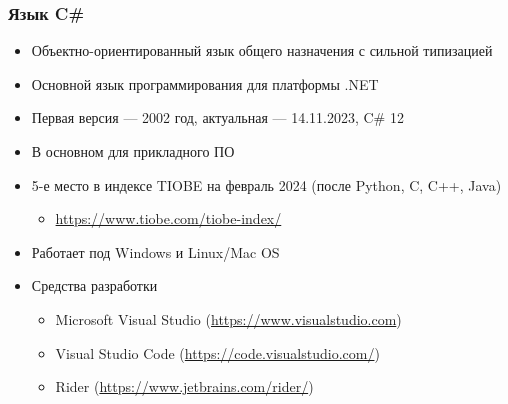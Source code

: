 \documentclass{../../slides-style}
\begin{document}
    \begin{frame}
        \frametitle{Язык C\#}
        \begin{itemize}
            \item Объектно-ориентированный язык общего назначения с сильной типизацией
            \item Основной язык программирования для платформы .NET
            \item Первая версия --- 2002 год, актуальная --- 14.11.2023, C\# 12
            \item В основном для прикладного ПО
            \item 5-е место в индексе TIOBE на февраль 2024 (после Python, C, C++, Java)
            \begin{itemize}
                \item \url{https://www.tiobe.com/tiobe-index/}
            \end{itemize}
            \item Работает под Windows и Linux/Mac OS
            \item Средства разработки
            \begin{itemize}
                \item Microsoft Visual Studio (\url{https://www.visualstudio.com})
                \item Visual Studio Code (\url{https://code.visualstudio.com/})
                \item Rider (\url{https://www.jetbrains.com/rider/})
            \end{itemize}
        \end{itemize}
    \end{frame}
\end{document}
